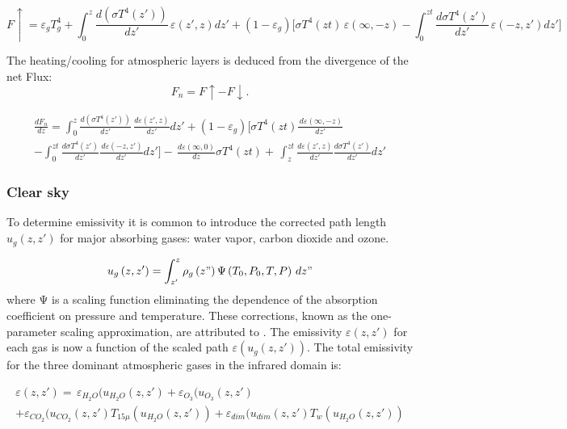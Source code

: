 \begin{equation}
F\uparrow =\varepsilon_{g}T_{g}^{4}+\int_0^z {\frac{d\left( \sigma
T^{4}\left( z' \right) \right)}{dz'}\, \varepsilon \left( z',z
\right)dz'+\left( 1-\varepsilon_{g} \right)[\sigma T^{4}} \left( zt
\right)\, \varepsilon \left( \infty ,-z \right)-\int_0^{zt} \frac{d\sigma
T^{4}\left( z' \right)}{dz'} \, \varepsilon (-z,z')dz']
\end{equation}

The heating/cooling for atmospheric layers is deduced from the divergence of
the net Flux:
\begin{equation}
F_{n}=F\uparrow -F\downarrow .
\end{equation}

\begin{multline}
\frac{dF_{n}}{dz}=\int_0^z {\frac{d\left( \sigma T^{4}\left( z' \right)
\right)}{dz'}\, \frac{d\varepsilon \left( z',z
\right)}{dz'}dz'
+\left( 1-\varepsilon_{g} \right)[\sigma T^{4}} \left(zt \right)\frac{\, d\varepsilon \left( \infty ,-z \right)}{dz'}\\
-\int_0^{zt} \frac{d\sigma T^{4}\left( z' \right)}{dz'} \frac{\, d\varepsilon \left( -z,z' \right)}{dz'}dz']
-\, \frac{d\varepsilon \left( \infty ,0 \right)}{dz}\sigma T^{4}\left( zt \right)
+\, \int_z^{zt} {\frac{d\varepsilon (z',z)}{dz'}\frac{d\sigma T^{4}(z')}{dz'}dz'}
\end{multline}

\subsubsection{Clear sky}
To determine emissivity it is common to introduce the corrected path length
$u_{g}(z,z')$ for major absorbing gases: water vapor, carbon dioxide and ozone.

\begin{equation}
u_{g}\left( z,z' \right)=\int_{z'}^{z} \rho_{g} \left( z"
\right)\mathrm{\Psi }\left( T_{0},P_{0},T,P \right)\, dz"
\end{equation}
where $\mathrm{\Psi }$ is a scaling function eliminating the dependence of
the absorption coefficient on pressure and temperature. These corrections,
known as the one-parameter scaling approximation, are attributed to \cite{Chou:1980}.
The emissivity $\varepsilon(z,z')$ for each gas is now a
function of the scaled path $\varepsilon (u_{g}(z,z'))$. The total emissivity for
the three dominant atmospheric gases in the infrared domain is:

\begin{multline}
\varepsilon \left( z,z' \right)=
\, \varepsilon_{H_{2}O}(u_{H_{2}O}\left(z,z' \right)
+\varepsilon_{O_{3}}(u_{O_{3}}\left( z,z' \right)\\
+\varepsilon_{CO_{2}}(u_{CO_{2}}\left( z,z' \right)T_{15\mu }\left( u_{H_{2}O}\left( z,z'
\right) \right)+\varepsilon_{dim}(u_{dim}\left( z,z' \right)T_{w}\left(
u_{H_{2}O}\left( z,z' \right) \right)
\end{multline}


